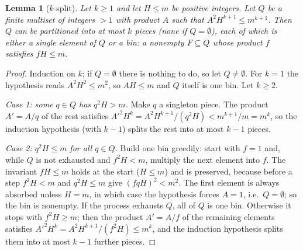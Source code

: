 \documentclass[11pt]{article}
\newtheorem{lemma}[theorem]{Lemma}
\theoremstyle{definition}
\begin{document}
\begin{lemma}[$k$-split]\label{lem:ksplit}
Let $k\ge 1$ and let $H\le m$ be positive integers. Let $Q$ be a finite multiset of integers $>1$ with product $A$
such that $A^2H^{k+1}\le m^{k+1}$. Then $Q$ can be partitioned into at most $k$ pieces (none if $Q=\emptyset$), each
of which is either a single element of $Q$ or a \emph{bin}: a nonempty $F\subseteq Q$ whose product $f$ satisfies
$fH\le m$.
\end{lemma}
\begin{proof}
Induction on $k$; if $Q=\emptyset$ there is nothing to do, so let $Q\ne\emptyset$. For $k=1$ the hypothesis reads
$A^2H^2\le m^2$, so $AH\le m$ and $Q$ itself is one bin. Let $k\ge 2$.

\emph{Case 1: some $q\in Q$ has $q^2H>m$.} Make $q$ a singleton piece. The product $A'=A/q$ of the rest satisfies
$A'^2H^k=A^2H^{k+1}/(q^2H)<m^{k+1}/m=m^k$, so the induction hypothesis (with $k-1$) splits the rest into at most
$k-1$ pieces.

\emph{Case 2: $q^2H\le m$ for all $q\in Q$.} Build one bin greedily: start with $f=1$ and, while $Q$ is not exhausted
and $f^2H<m$, multiply the next element into $f$. The invariant $fH\le m$ holds at the start ($H\le m$) and is
preserved, because before a step $f^2H<m$ and $q^2H\le m$ give $(fqH)^2<m^2$. The first element is always absorbed
unless $H=m$, in which case the hypothesis forces $A=1$, i.e.\ $Q=\emptyset$; so the bin is nonempty. If the process
exhausts $Q$, all of $Q$ is one bin. Otherwise it stops with $f^2H\ge m$; then the product $A'=A/f$ of the remaining
elements satisfies $A'^2H^k=A^2H^{k+1}/(f^2H)\le m^k$, and the induction hypothesis splits them into at most $k-1$
further pieces.
\end{proof}
\end{document}
